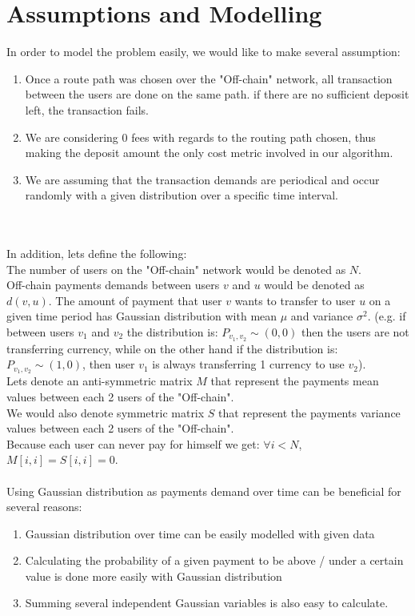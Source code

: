 \documentclass{cup-ino}
\begin{document}
\section{Assumptions and Modelling}
In order to model the problem easily, we would like to make several assumption:\\
\begin{enumerate}
    \item Once a route path was chosen over the "Off-chain" network, all transaction between the users are done on the same path. if there are no sufficient deposit left, the transaction fails.
    \item We are considering 0 fees with regards to the routing path chosen, thus making the deposit amount the only cost metric involved in our algorithm.
    \item We are assuming that the transaction demands are periodical and occur randomly with a given distribution over a specific time interval. 
\end{enumerate}
\\\\
In addition, lets define the following:\\
The number of users on the "Off-chain" network would be denoted as $N$.\\
Off-chain payments demands between users $v$ and $u$ would be denoted as $d(v,u)$. The amount of payment that user $v$ wants to transfer to user $u$ on a given time period has Gaussian distribution with mean $\mu$ and variance $\sigma ^2$.  (e.g. if between users $v_1$ and $v_2$ the distribution is: $P_{v_1,v_2} \sim (0,0)$ then the users are not transferring currency, while on the other hand if the distribution is: $P_{v_1,v_2} \sim (1,0)$, then user $v_1$ is always transferring 1 currency to use $v_2$).\\
Lets denote an anti-symmetric matrix $M$ that represent the payments mean values between each 2 users of the "Off-chain".\\
We would also denote symmetric matrix $S$ that represent the payments variance values between each 2 users of the "Off-chain".\\
Because each user can never pay for himself we get: $\forall i<N$, $M[i,i] = S[i,i] = 0$.\\ \\
Using Gaussian distribution as payments demand over time can be beneficial for several reasons:
\begin{enumerate}
    \item Gaussian distribution over time can be easily modelled with given data
    \item Calculating the probability of a given payment to be above / under a certain value is done more easily with Gaussian distribution
    \item Summing several independent Gaussian variables is also easy to calculate.\\
\end{enumerate}
\end{document}
